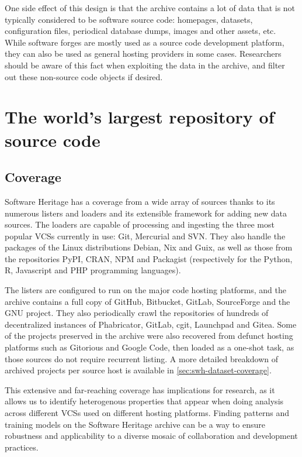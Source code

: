 One side effect of this design is that the archive contains a lot of data that
is not typically considered to be software source code: homepages, datasets,
configuration files, periodical database dumps, images and other assets, etc.
While software forges are mostly used as a source code development platform,
they can also be used as general hosting providers in some cases. Researchers
should be aware of this fact when exploiting the data in the archive, and
filter out these non-source code objects if desired.

\section{The world's largest repository of source code}

\subsection{Coverage}

Software Heritage has a coverage from a wide array of sources thanks to its
numerous listers and loaders and its extensible framework for adding new data
sources. The loaders are capable of processing and ingesting the three most
popular \glspl{VCS} currently in use: Git, Mercurial and SVN\@. They also handle
the packages of the Linux distributions Debian, Nix and Guix, as well as those
from the repositories PyPI, CRAN, NPM and Packagist (respectively for the
Python, R, Javascript and PHP programming languages).

The listers are configured to run on the major code hosting platforms, and the
archive contains a full copy of GitHub, Bitbucket, GitLab, SourceForge and the
GNU project. They also periodically crawl the repositories of hundreds of
decentralized instances of Phabricator, GitLab, cgit, Launchpad and Gitea.
Some of the projects preserved in the archive were also recovered from defunct
hosting platforms such as Gitorious and Google Code, then loaded as a one-shot
task, as those sources do not require recurrent listing. A more detailed
breakdown of archived projects per source host is available in
\cref{sec:swh-dataset-coverage}.

This extensive and far-reaching coverage has implications for research, as it
allows us to identify heterogenous properties that appear when doing analysis
across different \glspl{VCS} used on different hosting platforms. Finding
patterns and training models on the Software Heritage archive can be a way to
ensure robustness and applicability to a diverse mosaic of collaboration and
development practices.

